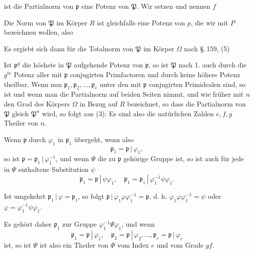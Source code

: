 ist die Partialnorm von $\mathfrak{p}$ eine Potenz von $\mathfrak{P}$. Wir setzen
und nennen $f$ 

Die Norm von $\mathfrak{P}$ im Körper $R$ ist gleichfalls eine Potenz von $p$, die wir mit $P$ bezeichnen wollen, also

Es ergiebt sich dann für die Totalnorm von $\mathfrak{P}$ im Körper $\Omega$ nach \S.\,159, (5) %

Ist $\mathfrak{p}^g$ die höchste in $\mathfrak{P}$ aufgehende Potenz von $\mathfrak{p}$, so ist $\mathfrak{P}$ nach 1. auch durch die $g^{\text{te}}$ Potenz aller mit $\mathfrak{p}$ conjugirten Primfactoren und durch keine höhere Potenz theilbar. Wenn nun $\mathfrak{p}_1, \mathfrak{p}_2, \ldots, \mathfrak{p}_e$  unter den mit $\mathfrak{p}$ conjugirten Primidealen sind, so ist
und wenn man die Partialnorm auf beiden Seiten nimmt, und wie früher mit $n$ den Grad des Körpers $\Omega$ in Bezug auf $R$ bezeichnet, so dass die Partialnorm von $\mathfrak{P}$ gleich $\mathfrak{P}^n$ wird, so folgt aus (3):
Es sind also die natürlichen Zahlen $e, f, g$ Theiler von $n$.

Wenn $\mathfrak{p}$ durch $\varphi_1$ in $\mathfrak{p}_1$ übergeht, wenn also
\[
\mathfrak{p}_1 = \mathfrak{p} \,|\, \varphi_1,
\]
so ist $\mathfrak{p} = \mathfrak{p}_1 \,|\, \varphi_1^{-1}$, und wenn $\Psi$ die zu $\mathfrak{p}$ gehörige Gruppe ist, so ist auch für jede in $\Psi$ enthaltene Substitution $\psi$
\[
\mathfrak{p}_1 = \mathfrak{p} \,|\, \psi \varphi_1, \quad \mathfrak{p}_1 = \mathfrak{p}_1 \,|\, \varphi_1^{-1} \psi \varphi_1.
\]

Ist umgekehrt $\mathfrak{p}_1 \,|\, \varphi = \mathfrak{p}_1$, so folgt $\mathfrak{p} \,|\, \varphi_1 \varphi \varphi_1^{-1} = \mathfrak{p}$, d. h. $\varphi_1 \varphi \varphi_1^{-1} = \psi$ oder $\varphi = \varphi_1^{-1} \psi \varphi_1$.

Es gehört daher $\mathfrak{p}_1$ zur Gruppe $\varphi_1^{-1} \Psi \varphi_1$, und wenn
\[
\mathfrak{p}_1 = \mathfrak{p} \,|\, \varphi_1, \quad \mathfrak{p}_2 = \mathfrak{p} \,|\, \varphi_2, \ldots, \mathfrak{p}_e = \mathfrak{p} \,|\, \varphi_e
\]
ist, so ist
$\Psi$ ist also ein Theiler von $\Phi$ vom Index $e$ und vom Grade $gf$.
